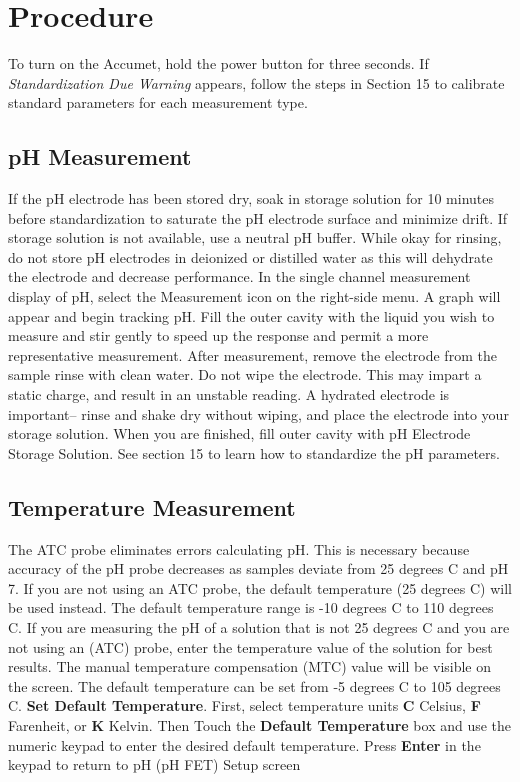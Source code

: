 \documentclass[12pt]{../SOP3_beta}\usepackage[]{graphicx}\usepackage[]{color}
\begin{document}
\section{Procedure}

\NP To turn on the Accumet, hold the power button for three seconds.
\NP If \emph{Standardization Due Warning} appears, follow the steps in Section 15 to calibrate standard parameters for each measurement type.

\subsection{pH Measurement}
\NP If the pH electrode has been stored dry, soak in storage solution for 10 minutes before standardization to saturate the pH electrode surface and minimize drift. If storage solution is not available, use a neutral pH buffer. While okay for rinsing, do not store pH electrodes in deionized or distilled water as this will dehydrate the electrode and decrease performance.
\NP In the single channel measurement display of pH, select the Measurement icon on the right-side menu. A graph will appear and begin tracking pH.
\NP Fill the outer cavity with the liquid you wish to measure and stir gently to speed up the response and permit a more representative measurement.
\NP After measurement, remove the electrode from the sample rinse with clean water. Do not wipe the electrode. This may impart a static charge, and result in an unstable reading. A hydrated electrode is important– rinse and shake dry without wiping, and place the electrode into your storage solution.
\NP When you are finished, fill outer cavity with pH Electrode Storage Solution.
\NP See section 15 to learn how to standardize the pH parameters.

\subsection{Temperature Measurement}
\NP The ATC probe eliminates errors calculating pH. This is necessary because accuracy of the pH probe decreases as samples deviate from 25 degrees C and pH 7. If you are not using an ATC probe, the default temperature (25 degrees C) will be used instead. The default temperature range is -10 degrees C to 110 degrees C. 
\NP If  you  are measuring the  pH  of  a  solution  that  is  not  25 degrees C  and  you  are  not  using  an (ATC)  probe, enter  the  temperature  value  of  the  solution  for  best  results.
The manual temperature compensation (MTC) value will be visible on the screen. The default temperature can be set from -5 degrees C to 105 degrees C.
\NP\textbf{Set Default Temperature}. First, select temperature units \textbf{C} Celsius, \textbf{F} Farenheit, or \textbf{K} Kelvin. Then Touch the \textbf{Default Temperature} box and use the numeric keypad to enter the desired default temperature.
Press \textbf{Enter} in the keypad to return to pH (pH FET) Setup screen
\end{document}
